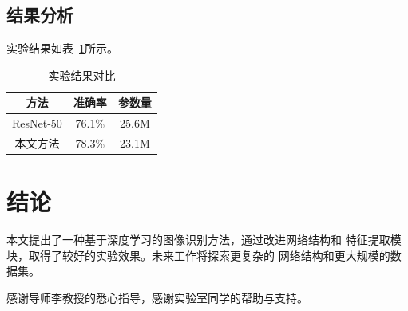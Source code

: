\documentclass[degree=bachelor]{sduthesis}
\begin{document}
\section{结果分析}
实验结果如表~\ref{tab:results}所示。

\begin{table}[htbp]
  \centering
  \caption{实验结果对比}
  \begin{tabular}{ccc}
    \toprule
    方法 & 准确率 & 参数量 \\
    \midrule
    ResNet-50 & 76.1\% & 25.6M \\
    本文方法 & 78.3\% & 23.1M \\
    \bottomrule
  \end{tabular}
  \label{tab:results}
\end{table}

\chapter{结论}
\label{chapter:conclusion}

本文提出了一种基于深度学习的图像识别方法，通过改进网络结构和
特征提取模块，取得了较好的实验效果。未来工作将探索更复杂的
网络结构和更大规模的数据集。

\nocite{*}


\begin{acknowledgement}
感谢导师李教授的悉心指导，感谢实验室同学的帮助与支持。
\end{acknowledgement}
\end{document}
